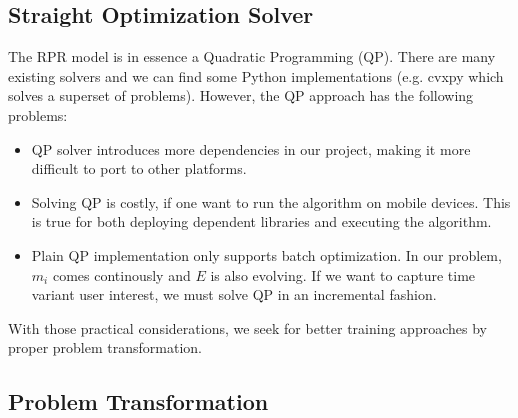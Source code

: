 \documentclass{sig-alternate}
\begin{document}
\subsection{Straight Optimization Solver}
\label{sec:Straight Optimization Solver}


The RPR model is in essence a Quadratic Programming (QP). 
There are many existing solvers and 
we can find some Python implementations 
(e.g. cvxpy which solves a superset of problems). 
However, the QP approach has the following problems:
\begin{itemize}
	\item QP solver introduces more dependencies in our project, 
		making it more difficult to port to other platforms. 
	\item Solving QP is costly, 
		if one want to run the algorithm on mobile devices. 
		This is true for both deploying dependent libraries and executing the algorithm.
	\item Plain QP implementation only supports batch optimization. 
		In our problem, $m_i$ comes continously and $E$ is also evolving. 
		If we want to capture time variant user interest, we must 
		solve QP in an incremental fashion. 
\end{itemize}


With those practical considerations, we seek for 
better training approaches by proper problem transformation. 

\subsection{Problem Transformation}
\label{sec:Problem Transformation}
\end{document}

